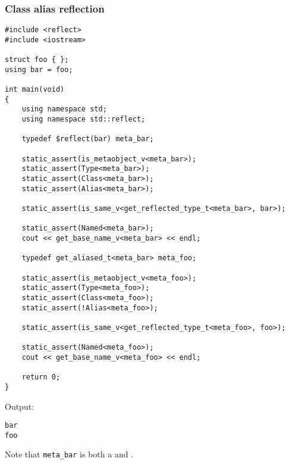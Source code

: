 \subsubsection{Class alias reflection}

\begin{verbatim}
#include <reflect>
#include <iostream>

struct foo { };
using bar = foo;

int main(void)
{
	using namespace std;
	using namespace std::reflect;

	typedef $reflect(bar) meta_bar;

	static_assert(is_metaobject_v<meta_bar>);
	static_assert(Type<meta_bar>);
	static_assert(Class<meta_bar>);
	static_assert(Alias<meta_bar>);

	static_assert(is_same_v<get_reflected_type_t<meta_bar>, bar>);

	static_assert(Named<meta_bar>);
	cout << get_base_name_v<meta_bar> << endl;

	typedef get_aliased_t<meta_bar> meta_foo;

	static_assert(is_metaobject_v<meta_foo>);
	static_assert(Type<meta_foo>);
	static_assert(Class<meta_foo>);
	static_assert(!Alias<meta_foo>);

	static_assert(is_same_v<get_reflected_type_t<meta_foo>, foo>);

	static_assert(Named<meta_foo>);
	cout << get_base_name_v<meta_foo> << endl;

	return 0;
}
\end{verbatim}

Output:

\begin{verbatim}
bar
foo
\end{verbatim}

Note that \texttt{meta\_bar} is both a  and .

